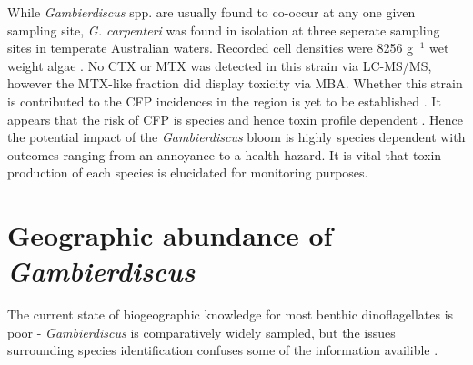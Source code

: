 \documentclass[12pt]{article}
\begin{document}
While \emph{Gambierdiscus} spp. are usually found to co-occur at any one given sampling site, \emph{G. carpenteri} was found in isolation at three seperate sampling sites in temperate Australian waters. Recorded cell densities were 8256 g$^{-1}$ wet weight algae \cite{kohli2014high}. No CTX or MTX was detected in this strain via LC-MS/MS, however the MTX-like fraction did display toxicity via MBA. Whether this strain is contributed to the CFP incidences in the region is yet to be established \cite{kohli2014high}. 
It appears that the risk of CFP is species and hence toxin profile dependent \cite{berdalet2012global}. Hence the potential impact of the \emph{Gambierdiscus} bloom is highly species dependent with outcomes ranging from an annoyance to a health hazard. It is vital that toxin production of each species is elucidated for monitoring purposes. \\%


\section{Geographic abundance of \emph{Gambierdiscus}}
The current state of biogeographic knowledge for most benthic dinoflagellates is poor - \emph{Gambierdiscus} is comparatively widely sampled, but the issues surrounding species identification confuses some of the information availible \cite{marine2014}.
\end{document}
